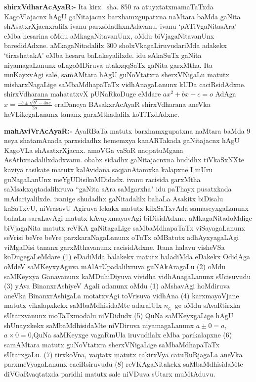 \textbf{shirxVdharAcAyaR:-} Ita kirx.~sha. {\rm 850} ra atuyxtatxmamaTaTxda KagoVlajacnx hAgU gaNitajacnx barxhamxgupatxna naMtara baMda gaNita shAsatxrXjacnxralilx ivanu parxsidadhxnAdavanu. ivanu `pATiVgaNitasAra' eMba hesarina oMdu aMkagaNitavanUnx, oMdu biVjagaNitavanUnx baredidAdxne. aMkagaNitadalilx {\rm 300} sholxVkagaLiruvudariMda adakekx `tirxshatakA' eMba hesaru baLake\-yalilxde. idu sAkaSuTx gaNita niyamagaLanunx oLagoMDiruva utakxqqSaTx gaNita garxMtha. Ita muKayxvAgi sale, samAMtara hAgU guNoVtatxra sherxVNigaLu matutx misharxNagaLige saMbaMdhapaTaTx vidhAnagaLanunx kUDa caciRsidAdxne. shirxVdharana mahatatxvX pUNaRkoDuge eMdare $ax^{2}+bx+c=o$ AdAga   $x= \frac{-b \pm \sqrt{b^{2}-4ac}}{2a}$
eraDaneya BAsakxrA\-cAyaR shirxVdharana aneVka heVLikegaLanunx tananx garxMthadalilx koTiTxdAdxne.

\textbf{mahAviVrAcAyaR:-} AyaRBaTa matutx barxhamxgupatxna naMtara baMda {\rm 9} neya shatamAnada parxsidadhx hememxya kanARTakada gaNitajacnx hAgU KagoVLa shAsatxrXjacnx. amoVGa vaSaR naqpatuMgana AsAthxnadalilxdadxvanu. obabx sidadhx gaNitajacnxna budidhx tiVkaSxNXte kaviya rasikate matutx kalAvidana saqjanAtamxka kalapxne I mUru guNagaLanUnx meYgUDisi\break koMDidadx. ivanu racisida garxMtha saMsakxqqtadalilxruva ``gaNita sAra saMgarxha" idu paThayx pusatxkada mAdariyalilxde. ivanige shudadhx gaNitadalilx bahaLa Asakitx biDisalu kaSaTxvU, niVrasavU Agiruva lekakx matutx kilxSaTxvAda samaseyxgaLanunx bahaLa saraLavAgi matutx kAvayxmayavAgi biDisidAdxne. aMkagaNitadoMdige biVjagaNita matutx reVKA gaNitagaLige saMbaMdhapaTaTx viSayagaLanunx seVrisi beVre beVre parxkaraNagaLanunx oTuTx oMBatutx adhAyxya\-gaLAgi viMgaDisi tananx garxMthavanunx racisidAdxne. Itana halavu visheVSa koDugegaLeMdare {\rm (1)} eDadiMda balakekx matutx baladiMda eDakekx OdidAga oMdeV saMKeyxyAguva mAlA\-rUpadalilxruva guNAkAragaLu {\rm (2)} oMdu saMKeyxya Ganavanunx kaMDuhiDiyuva vividha vidhAnagaLanunx sUcisuvudu {\rm (3)} yAva BinanxrAshiyeV Agali adanunx oMdu {\rm (1)} aMshavAgi hoMdiruva aneVka BinanxrAshigaLa motatxvAgi toVrisuva vidhAna {\rm (4)} karxmayoVjane matutx vikalapxkekx saMbaMdhisidaMte adaralUlx $n_{c_{r}}$ ge oMdu sAvaRtirxka sUtarxvanunx moTaTxmodalu niVDidudx {\rm (5)} QuNa saMKeyxgaLige hAgU shUnayxkekx saMbaMdhisi\-daMte niVDiruva niyamagaLanunx 
$a \pm 0 = a$, $a \times 0 = 0$,\break QuNa saMKeyxge vagaRmUla iruvudilalx eMba parikalapxne {\rm (6)} samAMtara matutx guNoVtatxra sherxVNigaLige saMbaMdhapaTaTx sUtarxgaLu. {\rm (7)} tirxkoVna, vaqtatx matutx cakirxVya catuBuRjagaLa aneVka parxmeVyagaLanunx caciRsiruvudu {\rm (8)} reVKAgaNitakekx saMbaMdhisidaMte diVGaRvaqtatxda paridhi matutx sale niVDuva sUtarx muMtAduvu.

